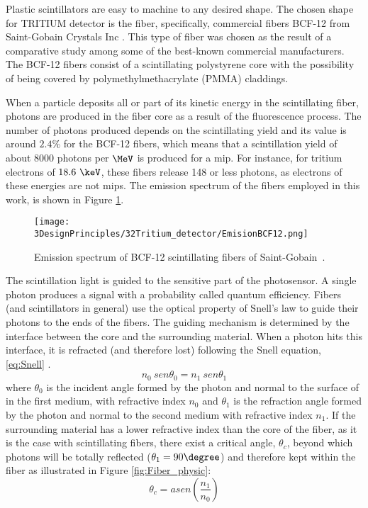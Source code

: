 Plastic scintillators are easy to machine to any desired shape. The chosen shape for TRITIUM detector is the fiber, specifically, commercial fibers BCF-12 from Saint-Gobain Crystals Inc \cite{DataSheetBCF12Fiber}. This type of fiber was chosen as the result of a comparative study \cite{TFGAlberto} among some of the best-known commercial manufacturers. The BCF-12 fibers consist of a scintillating polystyrene core with the possibility of being covered by polymethylmethacrylate (PMMA) claddings. %

When a particle deposits all or part of its kinetic energy in the scintillating fiber, photons are produced in the fiber core as a result of the fluorescence process. The number of photons produced depends on the scintillating yield and its value is around $2.4\%$ for the BCF-12 fibers, which means that a scintillation yield of about $8000$ photons per $\MeV$ is produced for a mip. For instance, for tritium electrons of $18.6~\keV$, these fibers release 148 or less photons, as electrons of these energies are not mips. The emission spectrum of the fibers employed in this work, is shown in Figure \ref{fig:EmissionSpectrumFibers}.

\begin{figure}[htbp]
\centering
\texttt{[image: 3DesignPrinciples/32Tritium\_detector/EmisionBCF12.png]}
\caption{Emission spectrum of BCF-12 scintillating fibers of Saint-Gobain\label{fig:EmissionSpectrumFibers}~\cite{DataSheetBCF12Fiber}.}
\end{figure}

The scintillation light is guided to the sensitive part of the photosensor. A single photon produces a signal with a probability called quantum efficiency. Fibers (and scintillators in general) use the optical property of Snell's law \cite{Snell} to guide their photons to the ends of the fibers. The guiding mechanism is determined by the interface between the core and the surrounding material. When a photon hits this interface, it is refracted (and therefore lost) following the Snell equation, \ref{eq:Snell} \cite{Snell}. 
\begin{equation}
n_0~sen\theta_0 = n_1~sen\theta_1
\label{eq:Snell}
\end{equation}
where $\theta_0$ is the incident angle formed by the photon and normal to the surface of in the first medium, with refractive index $n_0$ and $\theta_1$  is the refraction angle formed by the photon and normal to the second medium with refractive index $n_1$. If the surrounding material has a lower refractive index than the core of the fiber, as it is the case with scintillating fibers, there exist a critical angle, $\theta_c$, beyond which photons will be totally reflected ($\theta_1 = 90\degree$) and therefore kept within the fiber as illustrated in Figure \ref{fig:Fiber_physic}:
\begin{equation}
\theta_c = asen\left(\frac{n_1}{n_0} \right)
\label{eq:CriticAngle}
\end{equation}

